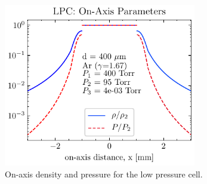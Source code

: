 \begin{figure}
	\centering
	\includegraphics[width=0.75\textwidth]{figures/chap3/LPC_on_axis.pdf}
	\caption{On-axis density and pressure for the low pressure cell.}
	\label{fig:LPC_on_axis}
\end{figure}

